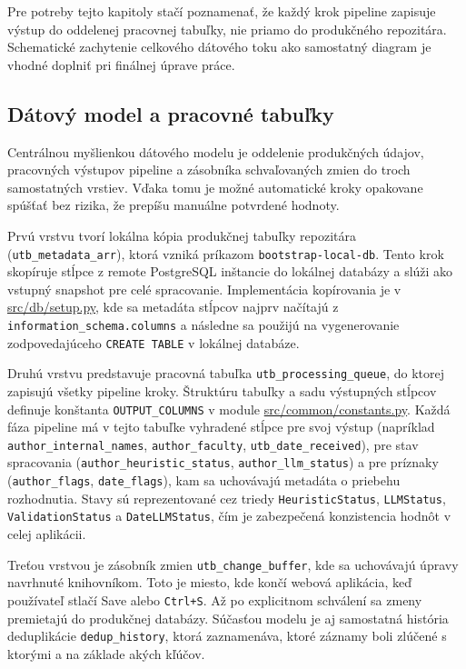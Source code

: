 Pre potreby tejto kapitoly stačí poznamenať, že každý krok pipeline zapisuje výstup do oddelenej pracovnej tabuľky, nie priamo do produkčného repozitára. Schematické zachytenie celkového dátového toku ako samostatný diagram je vhodné doplniť pri finálnej úprave práce.

\subsection{Dátový model a pracovné tabuľky}

Centrálnou myšlienkou dátového modelu je oddelenie produkčných údajov, pracovných výstupov pipeline a zásobníka schvaľovaných zmien do troch samostatných vrstiev. Vďaka tomu je možné automatické kroky opakovane spúšťať bez rizika, že prepíšu manuálne potvrdené hodnoty.

Prvú vrstvu tvorí lokálna kópia produkčnej tabuľky repozitára (\texttt{utb\_metadata\_arr}), ktorá vzniká príkazom \texttt{bootstrap-local-db}. Tento krok skopíruje stĺpce z remote PostgreSQL inštancie do lokálnej databázy a slúži ako vstupný snapshot pre celé spracovanie. Implementácia kopírovania je v \href{src/db/setup.py}{src/db/setup.py}, kde sa metadáta stĺpcov najprv načítajú z \texttt{information\_schema.columns} a následne sa použijú na vygenerovanie zodpovedajúceho \texttt{CREATE TABLE} v lokálnej databáze.

Druhú vrstvu predstavuje pracovná tabuľka \texttt{utb\_processing\_queue}, do ktorej zapisujú všetky pipeline kroky. Štruktúru tabuľky a sadu výstupných stĺpcov definuje konštanta \texttt{OUTPUT\_COLUMNS} v module \href{src/common/constants.py}{src/common/constants.py}. Každá fáza pipeline má v tejto tabuľke vyhradené stĺpce pre svoj výstup (napríklad \texttt{author\_internal\_names}, \texttt{author\_faculty}, \texttt{utb\_date\_received}), pre stav spracovania (\texttt{author\_heuristic\_status}, \texttt{author\_llm\_status}) a pre príznaky (\texttt{author\_flags}, \texttt{date\_flags}), kam sa uchovávajú metadáta o priebehu rozhodnutia. Stavy sú reprezentované cez triedy \texttt{HeuristicStatus}, \texttt{LLMStatus}, \texttt{ValidationStatus} a \texttt{DateLLMStatus}, čím je zabezpečená konzistencia hodnôt v celej aplikácii.

Treťou vrstvou je zásobník zmien \texttt{utb\_change\_buffer}, kde sa uchovávajú úpravy navrhnuté knihovníkom. Toto je miesto, kde končí webová aplikácia, keď používateľ stlačí Save alebo \texttt{Ctrl+S}. Až po explicitnom schválení sa zmeny premietajú do produkčnej databázy. Súčasťou modelu je aj samostatná história deduplikácie \texttt{dedup\_history}, ktorá zaznamenáva, ktoré záznamy boli zlúčené s ktorými a na základe akých kľúčov.

